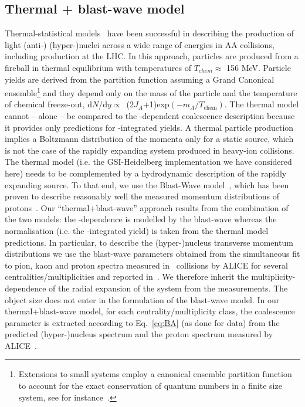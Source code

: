 \documentclass[a4paper,11pt]{article}
\begin{document}
\subsection{Thermal + blast-wave model} 
Thermal-statistical models~\cite{Andronic:2010qu, Andronic:2017} have been successful in describing the production of light (anti-) (hyper-)nuclei across a wide range of energies in AA collisions, including production at the LHC. 
In this approach, particles are produced from a fireball in thermal equilibrium with temperatures of $T_{chem} \approx$ 156 MeV. 
Particle yields are derived from the partition function assuming a Grand Canonical ensemble\footnote{Extensions to small systems employ a canonical ensemble partition function to account for the exact conservation of quantum numbers in a finite size system, see for instance~\cite{Vovchenko:2018fiy}.} and they depend only on the mass of the particle and the temperature of chemical freeze-out, d$N$/d$y\propto$~(2$J_A$+1)exp$(-m_{A}/T_{\mathrm{chem}})$.
The thermal model cannot -- alone -- be compared to the \pt-dependent coalescence description because it provides only predictions for \pt-integrated yields. 
A thermal particle production implies a Boltzmann distribution of the momenta only for a static source, which is not the case of the rapidly expanding system produced in heavy-ion collisions. 
The thermal model (i.e. the GSI-Heidelberg implementation we have considered here) needs to be complemented by a hydrodynamic description of the rapidly expanding source. 
To that end, we use the Blast-Wave model~\cite{Schnedermann:1993ws}, which has been proven to describe reasonably well the measured momentum distributions of protons~\cite{Abelev:2013vea}. 
Our ``thermal+blast-wave'' approach results from the combination of the two models: the \pt-dependence is modelled by the blast-wave whereas the normalisation (i.e. the \pt-integrated yield) is taken from the thermal model predictions.
In particular, to describe the (hyper-)nucleus transverse momentum distributions we use the blast-wave parameters obtained from the simultaneous fit to pion, kaon and proton spectra measured in \PbPb~collisions by ALICE for several centralities/multiplicities and reported in~\cite{Abelev:2013vea}. We therefore inherit the multiplicity-dependence of the radial expansion of the system from the measurements. The object size does not enter in the formulation of the blast-wave model. 
In our thermal+blast-wave model, for each centrality/multiplicity class, the coalescence parameter is extracted according to Eq.~\ref{eq:BA} (as done for data) from the predicted (hyper-)nucleus spectrum and the proton spectrum measured by ALICE~\cite{Abelev:2013vea}.
\end{document}
